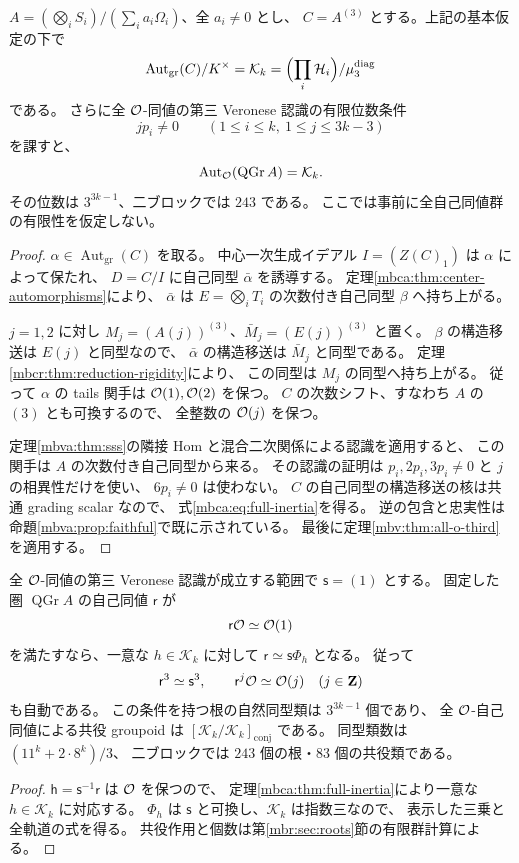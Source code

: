 \begin{theorem}[満支持型の全構造対象保存群]
\label{mbca:thm:full-inertia}
$A=(\bigotimes_iS_i)/(\sum_i a_i\Omega_i)$、全 $a_i\ne0$ とし、
$C=A^{(3)}$ とする。上記の基本仮定の下で
\begin{equation}\label{mbca:eq:full-inertia}
 \operatorname{Aut}_{\mathrm{gr}}(C)/K^\times
       =\mathcal K_k
       =\Bigl(\prod_i\mathcal H_i\Bigr)/\mu_3^{\mathrm{diag}}
\end{equation}
である。
さらに全 $\mathcal O$-同値の第三 Veronese 認識の有限位数条件
\[
 jp_i\ne0\qquad(1\le i\le k,\ 1\le j\le3k-3)
\]
を課すと、
\[
 \operatorname{Aut}_{\mathcal O}(\operatorname{QGr}A)=\mathcal K_k.
\]
その位数は $3^{3k-1}$、二ブロックでは $243$ である。
ここでは事前に全自己同値群の有限性を仮定しない。
\end{theorem}
\begin{proof}
$\alpha\in\operatorname{Aut}_{\mathrm{gr}}(C)$ を取る。
中心一次生成イデアル $I=(Z(C)_1)$ は $\alpha$ によって保たれ、
$D=C/I$ に自己同型 $\bar\alpha$ を誘導する。
定理\ref{mbca:thm:center-automorphisms}により、
$\bar\alpha$ は $E=\bigotimes_iT_i$ の次数付き自己同型 $\beta$ へ持ち上がる。

$j=1,2$ に対し
$M_j=(A(j))^{(3)}$、$\bar M_j=(E(j))^{(3)}$ と置く。
$\beta$ の構造移送は $E(j)$ と同型なので、
$\bar\alpha$ の構造移送は $\bar M_j$ と同型である。
定理\ref{mbcr:thm:reduction-rigidity}により、
この同型は $M_j$ の同型へ持ち上がる。
従って $\alpha$ の tails 関手は $\mathcal O(1),\mathcal O(2)$ を保つ。
$C$ の次数シフト、すなわち $A$ の $(3)$ とも可換するので、
全整数の $\mathcal O(j)$ を保つ。

定理\ref{mbva:thm:sss}の隣接 Hom と混合二次関係による認識を適用すると、
この関手は $A$ の次数付き自己同型から来る。
その認識の証明は $p_i,2p_i,3p_i\ne0$ と $j$ の相異性だけを使い、
$6p_i\ne0$ は使わない。
$C$ の自己同型の構造移送の核は共通 grading scalar なので、
式\eqref{mbca:eq:full-inertia}を得る。
逆の包含と忠実性は命題\ref{mbva:prop:faithful}で既に示されている。
最後に定理\ref{mbv:thm:all-o-third}を適用する。
\end{proof}

\begin{corollary}[第一対象を保つ三乗根の完全な分類]
\label{mbca:cor:marked-roots}
全 $\mathcal O$-同値の第三 Veronese 認識が成立する範囲で
$\mathsf s=(1)$ とする。
固定した圏 $\operatorname{QGr}A$ の自己同値 $\mathsf r$ が
\[
 \mathsf r\mathcal O\simeq\mathcal O(1)
\]
を満たすなら、一意な $h\in\mathcal K_k$ に対して
$\mathsf r\simeq\mathsf s\Phi_h$ となる。
従って
\[
 \mathsf r^3\simeq\mathsf s^3,\qquad
 \mathsf r^j\mathcal O\simeq\mathcal O(j)\quad(j\in\mathbf Z)
\]
も自動である。
この条件を持つ根の自然同型類は $3^{3k-1}$ 個であり、
全 $\mathcal O$-自己同値による共役 groupoid は
$[\mathcal K_k/\mathcal K_k]_{\mathrm{conj}}$ である。
同型類数は $(11^k+2\cdot8^k)/3$、
二ブロックでは $243$ 個の根・$83$ 個の共役類である。
\end{corollary}
\begin{proof}
$\mathsf h=\mathsf s^{-1}\mathsf r$ は $\mathcal O$ を保つので、
定理\ref{mbca:thm:full-inertia}により一意な $h\in\mathcal K_k$ に対応する。
$\Phi_h$ は $\mathsf s$ と可換し、$\mathcal K_k$ は指数三なので、
表示した三乗と全軌道の式を得る。
共役作用と個数は第\ref{mbr:sec:roots}節の有限群計算による。
\end{proof}

